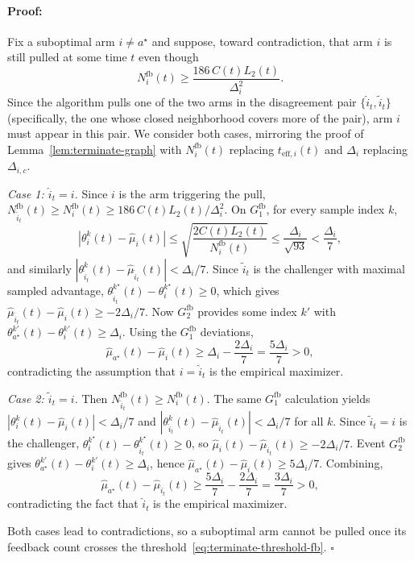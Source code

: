 \documentclass{article}
\newenvironment{proof}{\paragraph{Proof:}}{\hfill$\square$}
\begin{document}
\begin{proof}
Fix a suboptimal arm $i\neq a^\star$ and suppose, toward contradiction, that arm $i$ is still pulled at some time $t$ even though
\begin{equation}
\label{eq:terminate-threshold-fb}
N_i^{\mathrm{fb}}(t)
\ge
\frac{186\,C(t)L_2(t)}{\Delta_i^2}.
\end{equation}
Since the algorithm pulls one of the two arms in the disagreement pair $\{\widehat i_t,\widetilde i_t\}$ (specifically, the one whose closed neighborhood covers more of the pair), arm $i$ must appear in this pair. We consider both cases, mirroring the proof of Lemma~\ref{lem:terminate-graph} with $N_i^{\mathrm{fb}}(t)$ replacing $t_{\mathrm{eff},i}(t)$ and $\Delta_i$ replacing $\Delta_{i,c}$.

\emph{Case 1: $\widehat i_t = i$.}
Since $i$ is the arm triggering the pull, $N_{\widetilde i_t}^{\mathrm{fb}}(t)\ge N_i^{\mathrm{fb}}(t)\ge 186\,C(t)L_2(t)/\Delta_i^2$.
On $G_1^{\mathrm{fb}}$, for every sample index $k$,
\[
|\theta_i^k(t)-\widehat\mu_i(t)|
\le
\sqrt{\frac{2C(t)L_2(t)}{N_i^{\mathrm{fb}}(t)}}
\le
\frac{\Delta_i}{\sqrt{93}}
<
\frac{\Delta_i}{7},
\]
and similarly $|\theta_{\widetilde i_t}^k(t)-\widehat\mu_{\widetilde i_t}(t)|<\Delta_i/7$.
Since $\widetilde i_t$ is the challenger with maximal sampled advantage, $\theta_{\widetilde i_t}^{k^\star}(t)-\theta_i^{k^\star}(t)\ge 0$, which gives
$\widehat\mu_{\widetilde i_t}(t)-\widehat\mu_i(t)\ge -2\Delta_i/7$.
Now $G_2^{\mathrm{fb}}$ provides some index $k'$ with $\theta_{a^\star}^{k'}(t)-\theta_i^{k'}(t)\ge \Delta_i$. Using the $G_1^{\mathrm{fb}}$ deviations,
\[
\widehat\mu_{a^\star}(t)-\widehat\mu_i(t)
\ge
\Delta_i - \frac{2\Delta_i}{7}
= \frac{5\Delta_i}{7} > 0,
\]
contradicting the assumption that $i=\widehat i_t$ is the empirical maximizer.

\emph{Case 2: $\widetilde i_t = i$.}
Then $N_{\widehat i_t}^{\mathrm{fb}}(t)\ge N_i^{\mathrm{fb}}(t)$. The same $G_1^{\mathrm{fb}}$ calculation yields
$|\theta_i^k(t)-\widehat\mu_i(t)|<\Delta_i/7$ and $|\theta_{\widehat i_t}^k(t)-\widehat\mu_{\widehat i_t}(t)|<\Delta_i/7$ for all $k$.
Since $\widetilde i_t = i$ is the challenger, $\theta_i^{k^\star}(t)-\theta_{\widehat i_t}^{k^\star}(t)\ge 0$, so $\widehat\mu_i(t)-\widehat\mu_{\widehat i_t}(t)\ge -2\Delta_i/7$.
Event $G_2^{\mathrm{fb}}$ gives $\theta_{a^\star}^{k'}(t)-\theta_i^{k'}(t)\ge \Delta_i$, hence $\widehat\mu_{a^\star}(t)-\widehat\mu_i(t)\ge 5\Delta_i/7$. Combining,
\[
\widehat\mu_{a^\star}(t)-\widehat\mu_{\widehat i_t}(t)
\ge
\frac{5\Delta_i}{7}-\frac{2\Delta_i}{7}
=\frac{3\Delta_i}{7}>0,
\]
contradicting the fact that $\widehat i_t$ is the empirical maximizer.

Both cases lead to contradictions, so a suboptimal arm cannot be pulled once its feedback count crosses the threshold~\eqref{eq:terminate-threshold-fb}.
\end{proof}
\end{document}
